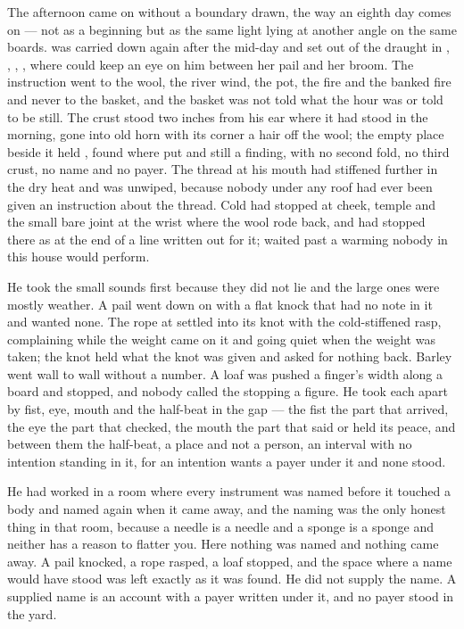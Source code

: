 The afternoon came on without a boundary drawn, the way an eighth day comes on --- not as a beginning but as the same light lying at another angle on the same boards.  was carried down again after the mid-day and set out of the draught in , , , , where  could keep an eye on him between her pail and her broom. The instruction went to the wool, the river wind, the pot, the fire and the banked fire and never to the basket, and the basket was not told what the hour was or told to be still. The crust stood two inches from his ear where it had stood in the morning, gone into old horn with its corner a hair off the wool; the empty place beside it held , found where put and still a finding, with no second fold, no third crust, no name and no payer. The thread at his mouth had stiffened further in the dry heat and was unwiped, because nobody under any roof had ever been given an instruction about the thread. Cold had stopped at cheek, temple and the small bare joint at the wrist where the wool rode back, and had stopped there as at the end of a line written out for it;  waited past a warming nobody in this house would perform.

He took the small sounds first because they did not lie and the large ones were mostly weather. A pail went down on  with a flat knock that had no note in it and wanted none. The rope at  settled into its knot with the cold-stiffened rasp, complaining while the weight came on it and going quiet when the weight was taken; the knot held what the knot was given and asked for nothing back. Barley went wall to wall without a number. A loaf was pushed a finger's width along a board and stopped, and nobody called the stopping a figure. He took each apart by fist, eye, mouth and the half-beat in the gap --- the fist the part that arrived, the eye the part that checked, the mouth the part that said or held its peace, and between them the half-beat, a place and not a person, an interval with no intention standing in it, for an intention wants a payer under it and none stood.

He had worked in a room where every instrument was named before it touched a body and named again when it came away, and the naming was the only honest thing in that room, because a needle is a needle and a sponge is a sponge and neither has a reason to flatter you. Here nothing was named and nothing came away. A pail knocked, a rope rasped, a loaf stopped, and the space where a name would have stood was left exactly as it was found. He did not supply the name. A supplied name is an account with a payer written under it, and no payer stood in the yard.

